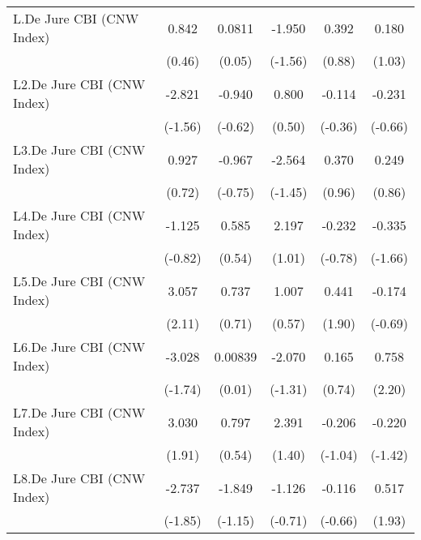 {\begin{longtable}{l*{5}{c}}
\addlinespace
L.De Jure CBI (CNW Index)&    0.842         &   0.0811         &   -1.950         &    0.392         &    0.180         \\
                &   (0.46)         &   (0.05)         &  (-1.56)         &   (0.88)         &   (1.03)         \\
\addlinespace
L2.De Jure CBI (CNW Index)&   -2.821         &   -0.940         &    0.800         &   -0.114         &   -0.231         \\
                &  (-1.56)         &  (-0.62)         &   (0.50)         &  (-0.36)         &  (-0.66)         \\
\addlinespace
L3.De Jure CBI (CNW Index)&    0.927         &   -0.967         &   -2.564         &    0.370         &    0.249         \\
                &   (0.72)         &  (-0.75)         &  (-1.45)         &   (0.96)         &   (0.86)         \\
\addlinespace
L4.De Jure CBI (CNW Index)&   -1.125         &    0.585         &    2.197         &   -0.232         &   -0.335         \\
                &  (-0.82)         &   (0.54)         &   (1.01)         &  (-0.78)         &  (-1.66)         \\
\addlinespace
L5.De Jure CBI (CNW Index)&    3.057\sym{*}  &    0.737         &    1.007         &    0.441         &   -0.174         \\
                &   (2.11)         &   (0.71)         &   (0.57)         &   (1.90)         &  (-0.69)         \\
\addlinespace
L6.De Jure CBI (CNW Index)&   -3.028         &  0.00839         &   -2.070         &    0.165         &    0.758\sym{*}  \\
                &  (-1.74)         &   (0.01)         &  (-1.31)         &   (0.74)         &   (2.20)         \\
\addlinespace
L7.De Jure CBI (CNW Index)&    3.030         &    0.797         &    2.391         &   -0.206         &   -0.220         \\
                &   (1.91)         &   (0.54)         &   (1.40)         &  (-1.04)         &  (-1.42)         \\
\addlinespace
L8.De Jure CBI (CNW Index)&   -2.737         &   -1.849         &   -1.126         &   -0.116         &    0.517         \\
                &  (-1.85)         &  (-1.15)         &  (-0.71)         &  (-0.66)         &   (1.93)         \\

\end{longtable}}
